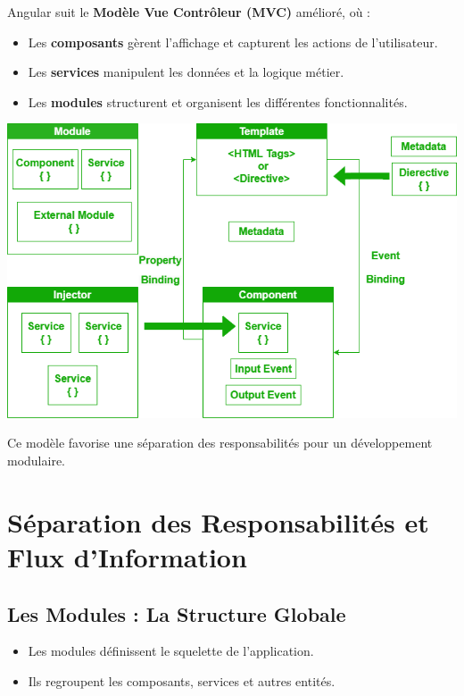 \documentclass{article}
\begin{document}
Angular suit le \textbf{Modèle Vue Contrôleur (MVC)} amélioré, où :
\begin{itemize}
    \item Les \textbf{composants} gèrent l’affichage et capturent les actions de l’utilisateur.
    \item Les \textbf{services} manipulent les données et la logique métier.
    \item Les \textbf{modules} structurent et organisent les différentes fonctionnalités.
\end{itemize}
\begin{tcolorbox}[colframe=black!70, colback=white, title=Figure 3: Architecture d'Angular, fonttitle=\bfseries]
\centering
\includegraphics[width=\textwidth]{images/archi.png}
\end{tcolorbox}
Ce modèle favorise une séparation des responsabilités pour un développement modulaire.

\section{Séparation des Responsabilités et Flux d’Information}

\subsection{Les Modules : La Structure Globale}
\begin{itemize}
    \item Les modules définissent le squelette de l’application.
    \item Ils regroupent les composants, services et autres entités.
\end{itemize}
\end{document}
